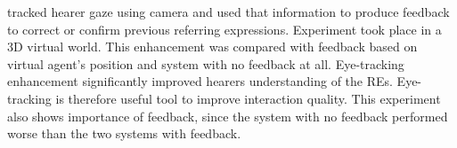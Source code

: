 \citet{koller2012enhancing} tracked hearer gaze using camera and used that information to produce feedback to correct or confirm previous referring expressions. Experiment took place in a 3D virtual world. This enhancement was compared with feedback based on virtual agent's position and system with no feedback at all. Eye-tracking enhancement significantly improved hearers understanding of the REs. Eye-tracking is therefore useful tool to improve interaction quality. This experiment also shows importance of feedback, since the system with no feedback performed worse than the two systems with feedback.